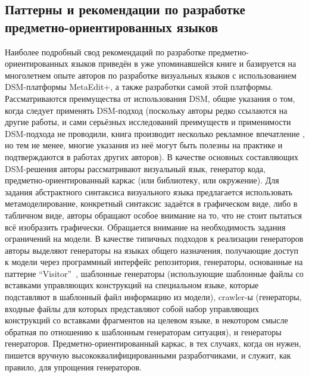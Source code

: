 \subsection{Паттерны и рекомендации по разработке предметно-ориентированных языков}
Наиболее подробный свод рекомендаций по разработке предметно-ориентированных языков 
приведён в уже упоминавшейся книге \cite{kelly2008domain} и базируется на многолетнем 
опыте авторов по разработке визуальных языков с использованием DSM-платформы MetaEdit+, 
а также разработки самой этой платформы. Рассматриваются преимущества от использования 
DSM, общие указания о том, когда следует применять DSM-подход (поскольку авторы редко 
ссылаются на другие работы, и сами серьёзных исследований преимуществ и применимости 
DSM-подхода не проводили, книга производит несколько рекламное впечатление%
, но тем не менее, многие указания из неё могут быть полезны на практике и подтверждаются в работах других 
авторов). В качестве основных составляющих DSM-решения авторы рассматривают визуальный 
язык, генератор кода, предметно-ориентированный каркас (или библиотеку, или окружение). 
Для задания абстрактного синтаксиса визуального языка предлагается использовать метамоделирование, 
конкретный синтаксис задаётся в графическом виде, либо в табличном виде, авторы обращают особое 
внимание на то, что не стоит пытаться всё изобразить графически. Обращается внимание 
на необходимость задания ограничений на модели. В качестве типичных подходов к реализации 
генераторов авторы выделяют генераторы на языках общего назначения, получающие доступ 
к модели через программный интерфейс репозитория, генераторы, основанные на паттерне "`Visitor"'~\cite{gamma2001patterns }, 
шаблонные генераторы (использующие шаблонные файлы со вставками управляющих конструкций на специальном языке, которые 
подставляют в шаблонный файл информацию из модели), crawler-ы (генераторы, входные файлы для которых представляют собой набор 
управляющих конструкций со вставками фрагментов на целевом языке, в некотором смысле 
обратная по отношению к шаблонным генераторам ситуация), и генераторы генераторов. 
Предметно-ориентированный каркас, в тех случаях, когда он нужен, пишется вручную высококвалифицированными 
разработчиками, и служит, как правило, для упрощения генераторов.

